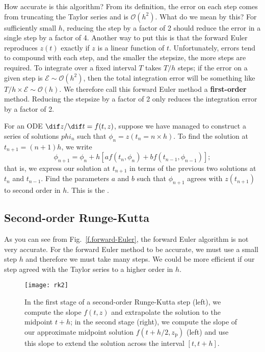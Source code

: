 How accurate is this  algorithm? From its definition, the error on each step comes from truncating the Taylor series and is $\mathcal{O}(h^{2})$. What do we mean by this? For sufficiently small $h$, reducing the step by a factor of 2 should reduce the error in a single step by a factor of 4. Another way to put this is that the forward Euler reproduces $z(t)$ exactly if $z$ is a linear function of $t$.
Unfortunately, errors tend to compound with each step, and the smaller the stepsize, the more steps are required. To integrate over a fixed interval $T$ takes $T/h$ steps; if the error on a given step is $\mathcal{E}\sim \mathcal{O}(h^{2})$, then the total integration error will be something like $T/h \times \mathcal{E} \sim \mathcal{O}(h)$.  We therefore call this forward Euler method a \textbf{first-order} method. Reducing the stepsize by a factor of 2 only reduces the integration error by a factor of 2.

\begin{exercisebox}
For an ODE $\dif z/\dif t = f(t,z)$, suppose we have managed to construct a series of solutions $phi_{n}$ such that $\phi_{n} = z(t_{n}=n\times h)$. To find the solution at $t_{n+1}=(n+1)h$, we write
\[
\phi_{n+1} = \phi_{n} + h\left[af(t_{n},\phi_{n}) + bf(t_{n-1},\phi_{n-1})\right];
\]
that is, we express our solution at $t_{n+1}$ in terms of the previous two solutions at $t_{n}$ and $t_{n-1}$. Find the parameters $a$ and $b$ such that $\phi_{n+1}$ agrees with $z(t_{n+1})$ to second order in $h$. This is the .
\end{exercisebox}

\subsection{Second-order Runge-Kutta}

As you can see from Fig.~\ref{f.forward-Euler}, the forward Euler algorithm is not very accurate.
For the forward Euler method to be accurate, we must use a small step $h$ and therefore we must take many steps. We could be more efficient if our step agreed with the Taylor series to a higher order in $h$.

\begin{figure}
\texttt{[image: rk2]}
\caption[The second-order Runge-Kutta method]{\label{f.rk2}
In the first stage of a second-order Runge-Kutta step (left), we compute the slope $f(t,z)$ and extrapolate the solution to the midpoint $t+h$; in the second stage (right), we compute the slope of our approximate midpoint solution $f(t+h/2,z_{\mathrm{p}})$ (left) and use this slope to extend the solution across the interval $[t,t+h]$.}
\end{figure}

